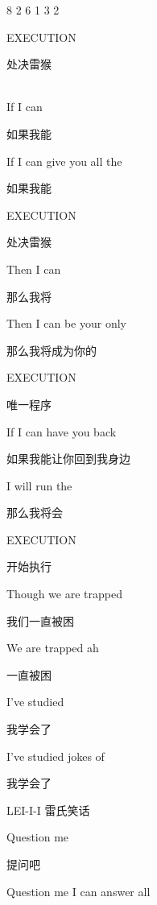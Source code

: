 \documentclass[UTF8,12pt,oneside]{ctexbook}
\begin{document}
\begin{center}
            8 2 6 1 3 2

            EXECUTION
            
            处决雷猴

            ~\\
            If I can
            
            如果我能
            
            If I can give you all the
            
            如果我能
            
            EXECUTION
            
            处决雷猴
            
            Then I can
            
            那么我将
            
            Then I can be your only
            
            那么我将成为你的
            
            EXECUTION
            
            唯一程序
            
            If I can have you back
            
            如果我能让你回到我身边
            
            I will run the
            
            那么我将会
            
            EXECUTION
            
            开始执行
            
            Though we are trapped
            
            我们一直被困
            
            We are trapped ah
            
            一直被困
            
            I've studied
            
            我学会了
            
            I've studied jokes of
            
            我学会了
            
            LEI-I-I
            雷氏笑话
            
            Question me
            
            提问吧
            
            Question me I can answer all
            

\end{center}
\end{document}

